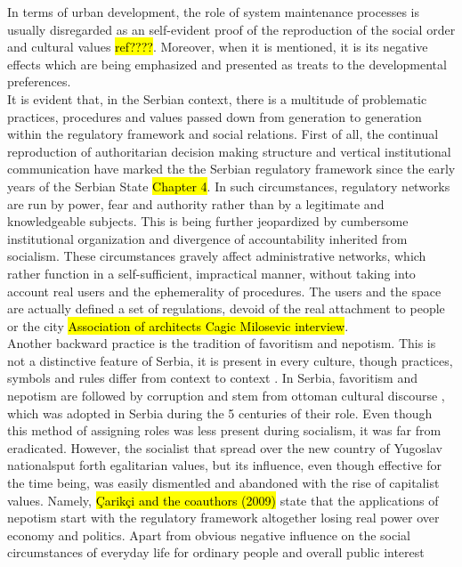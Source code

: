 \documentclass[11pt]{report}
\begin{document}
In terms of urban development, the role of system maintenance processes is usually disregarded as an self-evident proof of the reproduction of the social order and cultural values \hl{ref????}. 
Moreover, when it is mentioned, it is its negative effects which are being emphasized and presented as treats to the developmental preferences.
\\
It is evident that, in the Serbian context, there is a multitude of problematic practices, procedures and values passed down from generation to generation within the regulatory framework and social relations. 
First of all, the continual reproduction of authoritarian decision making structure and vertical institutional communication have marked the the Serbian regulatory framework since the early years of the Serbian State \hl{Chapter 4}.
In such circumstances, regulatory networks are run by power, fear and authority rather than by a legitimate and knowledgeable subjects.
This is being further jeopardized by cumbersome institutional organization and divergence of accountability inherited from socialism.
These circumstances gravely affect administrative networks, which rather function in a self-sufficient, impractical manner, without taking into account real users and the ephemerality of procedures.
The users and the space are actually defined a set of regulations, devoid of the real attachment to people or the city 
\hl{Association of architects Cagic Milosevic interview}.
\\
Another backward practice is the tradition of favoritism and nepotism.
This is not a distinctive feature of Serbia, it is present in every culture, though practices, symbols and rules differ from context to context \cite{Çarikçi et al.2009}.
In Serbia, favoritism and nepotism are followed by corruption and stem from ottoman cultural discourse \cite{Çarikçi et al.2009}, which was adopted in Serbia during the 5 centuries of their role.
Even though this method of assigning roles was less present during socialism, it was far from eradicated. However, the socialist that spread over the new country of Yugoslav nationals\footnotemark put forth egalitarian values, but its influence, even though effective for the time being, was  easily dismentled and abandoned with the rise of capitalist values. Namely, \hl{Çarikçi and the coauthors (2009)} state that the applications of nepotism start with the regulatory framework altogether losing real power over economy and politics.
Apart from obvious negative influence on the social circumstances of everyday life for ordinary people and overall public interest
\end{document}
